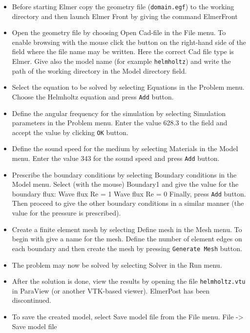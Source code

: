\begin{itemize}

\item Before starting Elmer copy the geometry file ({\tt domain.egf}) to the 
working directory and then launch Elmer Front by giving the command
\ttbegin
ElmerFront
\ttend 

\item Open the geometry file by choosing Open Cad-file in the  
File menu. To enable browsing with the mouse click the button on the 
right-hand side of the field where the file name may be written. Here
the correct Cad file type is Elmer. Give also the model name (for example
{\tt helmholtz}) and write the path of the working directory in the
Model directory field.  

\item Select the equation to be solved by selecting Equations in
the Problem menu. Choose the Helmholtz equation and press 
{\tt Add} button. 

\item Define the angular frequency for the simulation by selecting 
Simulation parameters in the Problem menu. Enter the value
628.3 to the field and accept the value by clicking {\tt OK} button.

\item Define the sound speed for the medium by selecting 
Materials in the Model menu. Enter the value
343 for the sound speed and press {\tt Add} button.

\item Prescribe the boundary conditions by selecting 
Boundary conditions in the Model menu. Select (with the mouse)
Boundary1 and give the value for the boundary flux: 
\ttbegin
Wave flux Re = 1
Wave flux Re = 0
\ttend 
Finally, press {\tt Add} button. Then proceed to give 
the other boundary conditions in a similar manner (the value for the 
pressure is prescribed).

\item Create a finite element mesh  by selecting 
Define mesh in the Mesh menu. To begin with give a name for the mesh.
Define the number of element
edges on each boundary and then create the mesh by pressing
{\tt Generate Mesh} button.   

\item The problem may now be solved by selecting Solver in the Run menu.

\item After the solution is done, view the results by opening the file
{\tt helmholtz.vtu} in ParaView (or another VTK-based viewer). ElmerPost has
been discontinued.
\item To save the created model, select Save model file from the File menu.
\ttbegin
File -> Save model file
\ttend
\end{itemize}


